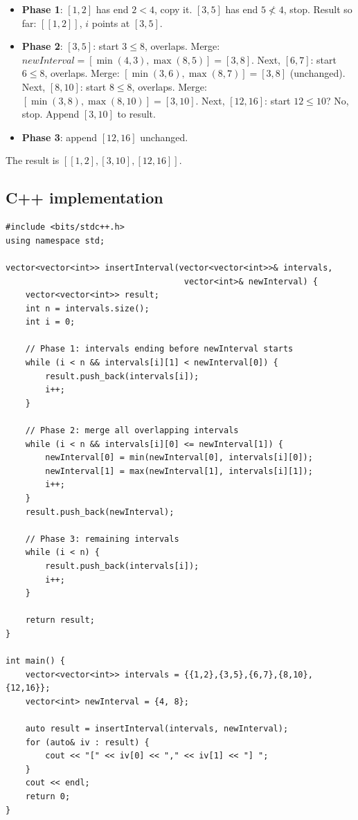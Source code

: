 \begin{itemize}
  \item \textbf{Phase 1}: $[1,2]$ has end $2 < 4$, copy it. $[3,5]$ has end
        $5 \not< 4$, stop. Result so far: $[[1,2]]$, $i$ points at $[3,5]$.
  \item \textbf{Phase 2}: $[3,5]$: start $3 \le 8$, overlaps. Merge:
        $\textit{newInterval}=[\min(4,3),\max(8,5)]=[3,8]$. Next, $[6,7]$:
        start $6\le8$, overlaps. Merge: $[\min(3,6),\max(8,7)]=[3,8]$
        (unchanged). Next, $[8,10]$: start $8\le8$, overlaps. Merge:
        $[\min(3,8),\max(8,10)]=[3,10]$. Next, $[12,16]$: start $12\le10$?
        No, stop. Append $[3,10]$ to result.
  \item \textbf{Phase 3}: append $[12,16]$ unchanged.
\end{itemize}

The result is $[[1,2],[3,10],[12,16]]$.

\subsection*{C++ implementation}

\begin{lstlisting}
#include <bits/stdc++.h>
using namespace std;

vector<vector<int>> insertInterval(vector<vector<int>>& intervals,
                                    vector<int>& newInterval) {
    vector<vector<int>> result;
    int n = intervals.size();
    int i = 0;

    // Phase 1: intervals ending before newInterval starts
    while (i < n && intervals[i][1] < newInterval[0]) {
        result.push_back(intervals[i]);
        i++;
    }

    // Phase 2: merge all overlapping intervals
    while (i < n && intervals[i][0] <= newInterval[1]) {
        newInterval[0] = min(newInterval[0], intervals[i][0]);
        newInterval[1] = max(newInterval[1], intervals[i][1]);
        i++;
    }
    result.push_back(newInterval);

    // Phase 3: remaining intervals
    while (i < n) {
        result.push_back(intervals[i]);
        i++;
    }

    return result;
}

int main() {
    vector<vector<int>> intervals = {{1,2},{3,5},{6,7},{8,10},{12,16}};
    vector<int> newInterval = {4, 8};

    auto result = insertInterval(intervals, newInterval);
    for (auto& iv : result) {
        cout << "[" << iv[0] << "," << iv[1] << "] ";
    }
    cout << endl;
    return 0;
}
\end{lstlisting}

